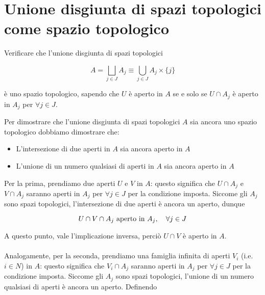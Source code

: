 \section{Unione disgiunta di spazi topologici come spazio topologico}\label{BONUS2-1}

\begin{tcolorbox}
	Verificare che l'unione disgiunta di spazi topologici
	
	\begin{equation}
		A = \bigsqcup_{j \in J} A_{j} \equiv \bigcup_{j \in J} A_{j} \times \{j\}
	\end{equation}
	
	è uno spazio topologico, sapendo che $ U $ è aperto in $ A $ se e solo se $ U \cap A_{j} $ è aperto in $ A_{j} $ per $ \forall j \in J $.
\end{tcolorbox}

Per dimostrare che l'unione disgiunta di spazi topologici $ A $ sia ancora uno spazio topologico dobbiamo dimostrare che:

\begin{itemize}
	\item L'intersezione di due aperti in $ A $ sia ancora aperto in $ A $
	
	\item L'unione di un numero qualsiasi di aperti in $ A $ sia ancora aperto in $ A $
\end{itemize}

Per la prima, prendiamo due aperti $ U $ e $ V $ in $ A $: questo significa che $ U \cap A_{j} $ e $ V \cap A_{j} $ saranno aperti in $ A_{j} $ per $ \forall j \in J $ per la condizione imposta. Siccome gli $ A_{j} $ sono spazi topologici, l'intersezione di due aperti è ancora un aperto, dunque

\begin{equation}
	U \cap V \cap A_{j} \text{ aperto in } A_{j} \qcomma \forall j \in J
\end{equation}

A questo punto, vale l'implicazione inversa, perciò $ U \cap V $ è aperto in $ A $.\\\\
Analogamente, per la seconda, prendiamo una famiglia infinita di aperti $ V_{i} $ (i.e. $ i \in N $) in $ A $: questo significa che $ V_{i} \cap A_{j} $ saranno aperti in $ A_{j} $ per $ \forall j \in J $ per la condizione imposta. Siccome gli $ A_{j} $ sono spazi topologici, l'unione di un numero qualsiasi di aperti è ancora un aperto. Definendo

